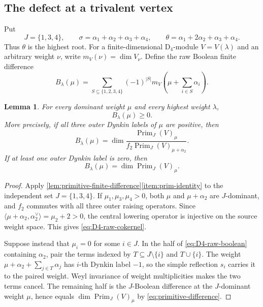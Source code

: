 \documentclass[11pt]{article}
\newtheorem{lemma}[lemma]{Lemma}
\theoremstyle{definition}
\theoremstyle{remark}
\newcommand{\typeD}{\ensuremath{\mathrm{D}}}
\begin{document}
\subsection{The defect at a trivalent vertex}\label{subsec:D4-defect}

Put
\[
 J=\{1,3,4\},\qquad
 \sigma=\alpha_1+\alpha_2+\alpha_3+\alpha_4,
 \qquad
 \theta=\alpha_1+2\alpha_2+\alpha_3+\alpha_4.
\]
Thus $\theta$ is the highest root.  For a finite-dimensional $\typeD_4$-module
$V=V(\lambda)$ and an arbitrary weight $\nu$, write
$m_V(\nu)=\dim V_\nu$.  Define the raw Boolean finite difference
\begin{equation}\label{eq:D4-raw-boolean}
 B_\lambda(\mu)
   =\sum_{S\subseteq\{1,2,3,4\}}(-1)^{|S|}
      m_V\!\left(\mu+\sum_{i\in S}\alpha_i\right).
\end{equation}


\begin{lemma}\label{lem:D4-raw-positive}
For every dominant weight $\mu$ and every highest weight $\lambda$,
\[
             B_\lambda(\mu)\ge0.
\]
More precisely, if all three outer Dynkin labels of $\mu$ are positive, then
\begin{equation}\label{eq:D4-raw-cokernel}
 B_\lambda(\mu)
 =\dim\frac{\operatorname{Prim}_J(V)_\mu}
 {f_2\operatorname{Prim}_J(V)_{\mu+\alpha_2}}.
\end{equation}
If at least one outer Dynkin label is zero, then
\begin{equation}\label{eq:D4-raw-wall}
 B_\lambda(\mu)=\dim\operatorname{Prim}_J(V)_\mu.
\end{equation}
\end{lemma}

\begin{proof}
Apply \cref{lem:primitive-finite-difference}\ref{item:prim-identity} to the
independent set $J=\{1,3,4\}$.  If $\mu_1,\mu_3,\mu_4>0$, both $\mu$ and
$\mu+\alpha_2$ are $J$-dominant, and $f_2$ commutes with all three outer
raising operators.  Since
$\langle\mu+\alpha_2,\alpha_2^\vee\rangle=\mu_2+2>0$, the central lowering
operator is injective on the source weight space.  This gives
\eqref{eq:D4-raw-cokernel}.

Suppose instead that $\mu_i=0$ for some $i\in J$.  In the half of
\eqref{eq:D4-raw-boolean} containing $\alpha_2$, pair the terms indexed by
$T\subseteq J\setminus\{i\}$ and $T\cup\{i\}$.  The weight
$\mu+\alpha_2+\sum_{j\in T}\alpha_j$ has $i$-th Dynkin label $-1$, so the
simple reflection $s_i$ carries it to the paired weight.  Weyl invariance of
weight multiplicities makes the two terms cancel.  The remaining half is the
$J$-Boolean difference at the $J$-dominant weight $\mu$, hence equals
$\dim\operatorname{Prim}_J(V)_\mu$ by
\eqref{eq:primitive-difference}.
\end{proof}
\end{document}
